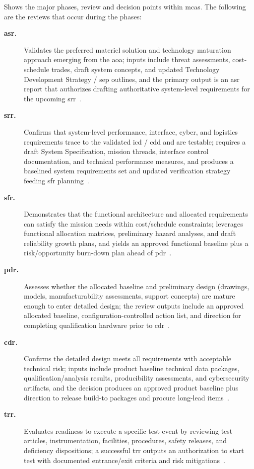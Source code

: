 \documentclass[../main.tex]{subfiles}
\begin{document}
\Fig{\ref{fig:mca_schedule_placeholder}} Shows the major phases, review and decision points within \acp{mca}. The following are the reviews that occur during the phases:
\begin{description}
  \item[\textbf{\ac{asr}.}] Validates the preferred materiel solution and technology maturation approach emerging from the \ac{aoa}; inputs include threat assessments, cost-schedule trades, draft system concepts, and updated Technology Development Strategy / \ac{sep} outlines, and the primary output is an \ac{asr} report that authorizes drafting authoritative system-level requirements for the upcoming \ac{srr}~\autocite{DoDI5000-85,DoDAcqGuidebook}.
  \item[\textbf{\ac{srr}.}] Confirms that system-level performance, interface, cyber, and logistics requirements trace to the validated \ac{icd} / \ac{cdd} and are testable; requires a draft System Specification, mission threads, interface control documentation, and technical performance measures, and produces a baselined system requirements set and updated verification strategy feeding \ac{sfr} planning~\autocite{DoDI5000-85,DoDAcqGuidebook}.
  \item[\textbf{\ac{sfr}.}] Demonstrates that the functional architecture and allocated requirements can satisfy the mission needs within cost/schedule constraints; leverages functional allocation matrices, preliminary hazard analyses, and draft reliability growth plans, and yields an approved functional baseline plus a risk/opportunity burn-down plan ahead of \ac{pdr}~\autocite{DoDI5000-85,DoDAcqGuidebook}.
  \item[\textbf{\ac{pdr}.}] Assesses whether the allocated baseline and preliminary design (drawings, models, manufacturability assessments, support concepts) are mature enough to enter detailed design; the review outputs include an approved allocated baseline, configuration-controlled action list, and direction for completing qualification hardware prior to \ac{cdr}~\autocite{DoDI5000-85,DoDAcqGuidebook}.
  \item[\textbf{\ac{cdr}.}] Confirms the detailed design meets all requirements with acceptable technical risk; inputs include product baseline technical data packages, qualification/analysis results, producibility assessments, and cybersecurity artifacts, and the decision produces an approved product baseline plus direction to release build-to packages and procure long-lead items~\autocite{DoDI5000-85,DoDAcqGuidebook}.
  \item[\textbf{\ac{trr}.}] Evaluates readiness to execute a specific test event by reviewing test articles, instrumentation, facilities, procedures, safety releases, and deficiency dispositions; a successful \ac{trr} outputs an authorization to start test with documented entrance/exit criteria and risk mitigations~\autocite{DoDI5000-85,DoDAcqGuidebook}.

\end{description}
\end{document}
